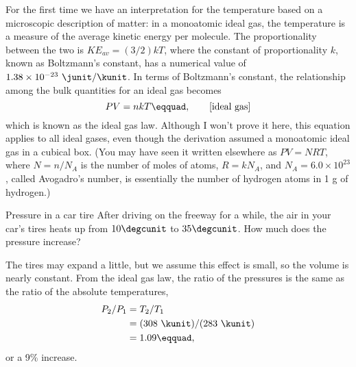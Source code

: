 For the first time we have an interpretation for the
temperature based on a microscopic description of matter: in
a monoatomic ideal gas, the temperature is a measure of the
average kinetic energy per molecule. The proportionality
between the two is $KE_{av}=(3/2)kT$, where the constant of
proportionality $k$, known as Boltzmann's constant, has a
numerical value of $1.38\times10^{-23}\ \junit/\kunit$. In terms of
Boltzmann's constant, the relationship among the bulk
quantities for an ideal gas becomes
\begin{equation*}
        PV        =  nkT\eqquad, \qquad \text{[ideal gas]}
\end{equation*}
which is known as the ideal gas law. 
Although I won't prove it here, this equation applies to all ideal gases, even
though the derivation assumed a monoatomic ideal gas in a cubical box.
 (You may have seen it
written elsewhere as $PV=NRT$, where $N=n/N_A$ is the number of
moles of atoms, $R=kN_A$, and $N_A=6.0\times10^{23}$, called
Avogadro's number, is essentially the number of hydrogen
atoms in 1 g of hydrogen.)

\begin{eg}{Pressure in a car tire}
\egquestion
After driving on the freeway for a while, the air
in your car's tires heats up from $10\degcunit$ to $35\degcunit$. How much
does the pressure increase?

\eganswer
The tires may expand a little, but we assume this
effect is small, so the volume is nearly constant. From the
ideal gas law, the ratio of the pressures is the same as the
ratio of the absolute temperatures,
\begin{align*}
          P_2/ P_1
                &= T_2/ T_1\\
                &=(308\ \kunit)/(283\ \kunit)\\
                &= 1.09\eqquad,\\
\end{align*}
or a 9\% increase.
\end{eg}


